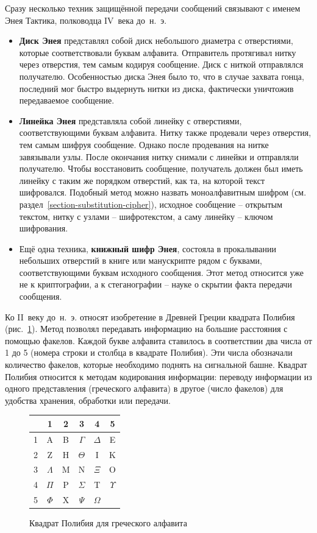 Сразу несколько техник защищённой передачи сообщений связывают с именем Энея Тактика, полководца IV~века до~н.~э.
\begin{itemize}
	\item \textbf{Диск Энея} представлял собой диск небольшого диаметра с отверстиями, которые соответствовали буквам алфавита. Отправитель протягивал нитку через отверстия, тем самым кодируя сообщение. Диск с ниткой отправлялся получателю. Особенностью диска Энея было то, что в случае захвата гонца, последний мог быстро выдернуть нитки из диска, фактически уничтожив передаваемое сообщение.
	\item \textbf{Линейка Энея} представляла собой линейку с отверстиями, соответствующими буквам алфавита. Нитку также продевали через отверстия, тем самым шифруя сообщение. Однако после продевания на нитке завязывали узлы. После окончания нитку снимали с линейки и отправляли получателю. Чтобы восстановить сообщение, получатель должен был иметь линейку с таким же порядком отверстий, как та, на которой текст шифровался. Подобный метод можно назвать моноалфавитным шифром (см. раздел~\ref{section-substitution-cipher}), исходное сообщение -- открытым текстом, нитку с узлами -- шифротекстом, а саму линейку -- ключом шифрования.
	\item Ещё одна техника, \textbf{книжный шифр Энея}, состояла в прокалывании небольших отверстий в книге или манускрипте рядом с буквами, соответствующими буквам исходного сообщения. Этот метод относится уже не к криптографии, а к стеганографии -- науке о скрытии факта передачи сообщения.
\end{itemize}

Ко II~веку до~н.~э. относят изобретение в Древней Греции квадрата Полибия (рис.~\ref{fig:polubios-square}). Метод позволял передавать информацию на большие расстояния с помощью факелов. Каждой букве алфавита ставилось в соответствии два числа от 1 до 5 (номера строки и столбца в квадрате Полибия). Эти числа обозначали количество факелов, которые необходимо поднять на сигнальной башне. Квадрат Полибия относится к методам кодирования информации: переводу информации из одного представления (греческого алфавита) в другое (число факелов) для удобства хранения, обработки или передачи.

\begin{figure}[t]
	\centering
\begin{tabular}{ || c || c | c | c | c | c ||}
\hline
\hline
  & 1 & 2 & 3 & 4 & 5 \\
\hline
\hline
1 & A & B & $\Gamma$ & $\Delta$ & E \\
\hline
2 & Z & H & $\Theta$ & I & K \\
\hline
3 & $\Lambda$ & M & N & $\Xi$ & O  \\
\hline
4 & $\Pi$ & P & $\Sigma$ & T & $\Upsilon$ \\
\hline
5 & $\Phi$ & X & $\Psi$ & $\Omega$ & \\
\hline
\hline
\end{tabular}
  \caption{Квадрат Полибия для греческого алфавита}
  \label{fig:polubios-square}
\end{figure}

